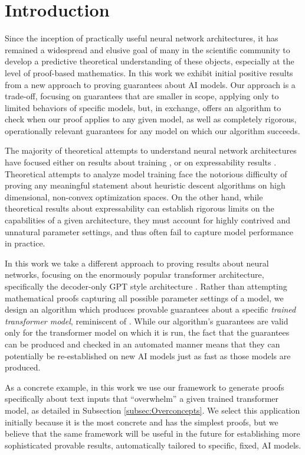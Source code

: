 \section{Introduction}


Since the inception of practically useful neural network architectures, it has remained a widespread and elusive goal of many in the scientific community to develop a predictive theoretical understanding of these objects, especially at the level of proof-based mathematics. 
In this work we exhibit initial positive results from a new approach to proving guarantees about AI models. 
Our approach is a trade-off, focusing on guarantees that are smaller in scope, applying only to limited behaviors of specific models, but, in exchange, offers an algorithm to check when our proof applies to any given model, as well as completely rigorous, operationally relevant guarantees for any model on which our algorithm succeeds.


The majority of theoretical attempts to understand neural network architectures have focused either on results about training  , or on expressability  results . 
Theoretical attempts to analyze model training face the notorious difficulty of proving any meaningful statement about heuristic descent algorithms on high dimensional, non-convex optimization spaces. 
On the other hand, while theoretical results about expressability can establish rigorous limits on the capabilities of a given architecture, they must account for highly contrived and unnatural parameter settings, and thus often fail to capture model performance in practice. 

In this work we take a different approach to proving results about neural networks, focusing on the enormously popular transformer architecture, specifically the decoder-only GPT style architecture . 
Rather than attempting mathematical proofs capturing all possible parameter settings of a model, we design an algorithm which produces provable guarantees about a specific \emph{trained transformer model}, reminiscent of .
While our algorithm's guarantees are valid only for the transformer model on which it is run, the fact that the guarantees can be produced and checked in an automated manner means that they can potentially be re-established on new AI models just as fast as those models are produced. 

As a concrete example, in this work we use our framework to generate proofs specifically about text inputs that ``overwhelm'' a given trained transformer model, as detailed in Subsection \ref{subsec:Overconcepts}. 
We select this application initially because it is the most concrete and has the simplest proofs, but we believe that the same framework will be useful in the future for establishing more sophisticated provable results, automatically tailored to specific, fixed, AI models. 

